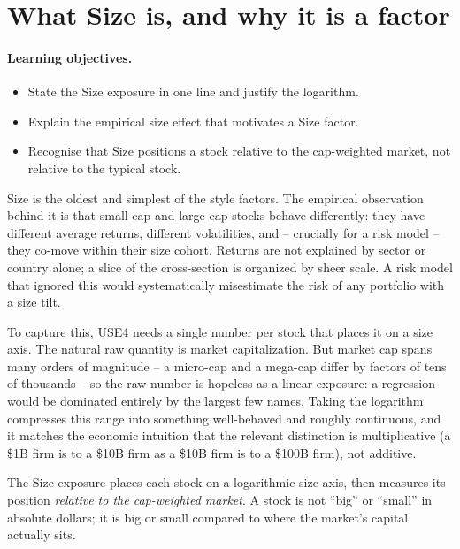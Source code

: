 \documentclass[11pt]{article}
\theoremstyle{definition}
\theoremstyle{plain}
\theoremstyle{remark}
\begin{document}
\tableofcontents
\bigskip

\section{What Size is, and why it is a factor}\label{sec:what}

\paragraph{Learning objectives.}
\begin{itemize}[leftmargin=1.4em,topsep=2pt,itemsep=1pt]
  \item State the Size exposure in one line and justify the logarithm.
  \item Explain the empirical size effect that motivates a Size factor.
  \item Recognise that Size positions a stock relative to the cap-weighted market, not relative to the typical stock.
\end{itemize}

Size is the oldest and simplest of the style factors. The empirical observation behind it is that small-cap and large-cap stocks behave differently: they have different average returns, different volatilities, and -- crucially for a risk model -- they co-move within their size cohort. Returns are not explained by sector or country alone; a slice of the cross-section is organized by sheer scale. A risk model that ignored this would systematically misestimate the risk of any portfolio with a size tilt.

To capture this, USE4 needs a single number per stock that places it on a size axis. The natural raw quantity is market capitalization. But market cap spans many orders of magnitude -- a micro-cap and a mega-cap differ by factors of tens of thousands -- so the raw number is hopeless as a linear exposure: a regression would be dominated entirely by the largest few names. Taking the logarithm compresses this range into something well-behaved and roughly continuous, and it matches the economic intuition that the relevant distinction is multiplicative (a \$1B firm is to a \$10B firm as a \$10B firm is to a \$100B firm), not additive.

\begin{intuition}
The Size exposure places each stock on a logarithmic size axis, then measures its position \emph{relative to the cap-weighted market}. A stock is not ``big'' or ``small'' in absolute dollars; it is big or small compared to where the market's capital actually sits.
\end{intuition}
\end{document}
